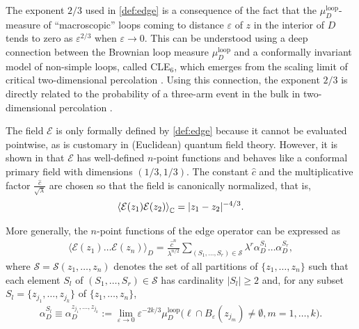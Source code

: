 \documentclass[a4paper,11pt]{article}
\begin{document}
The exponent $2/3$ used in \eqref{def:edge} is a consequence of the fact that the $\mu^{\text{loop}}_D$-measure of ``macroscopic'' loops coming to distance $\varepsilon$ of $z$ in the interior of $D$ tends to zero as $\varepsilon^{2/3}$ when $\varepsilon \to 0$. This can be understood using a deep connection \cite{2005math.....11605W} between the Brownian loop measure $\mu^{\text{loop}}_D$ and a conformally invariant model of non-simple loops, called CLE$_6$, which emerges from the scaling limit of critical two-dimensional percolation \cite{Camia_2006}. Using this connection, the exponent $2/3$ is directly related to the probability of a three-arm event in the bulk in two-dimensional percolation \cite{PhysRevLett.83.1359,Smirnov2001CRITICALEF}.

The field $\mathcal{E}$ is only formally defined by \eqref{def:edge} because it cannot be evaluated pointwise, as is customary in (Euclidean) quantum field theory. However,
it is shown in \cite{camia2021scalar} that $\mathcal{E}$ has well-defined $n$-point functions and behaves like a conformal primary field with dimensions $(1/3,1/3)$. The constant $\hat{c}$ and the multiplicative factor $\frac{\hat{c}}{\sqrt\lambda}$ are chosen so that the field is canonically normalized, that is,
\begin{align} \label{eq:canonical_edge}
    \Braket{{\mathcal E}(z_1){\mathcal E}(z_2)}_{\mathbb C} = |z_1-z_2|^{-4/3}.
\end{align}

More generally, the $n$-point functions of the edge operator can be expressed as
\begin{align} \label{eq:n-point-function}
    \langle {\mathcal E}(z_1) \ldots {\mathcal E}(z_n) \rangle_D = \frac{\hat{c}^n}{\lambda^{n/2}} \sum_{(S_1,\ldots,S_r) \in \mathcal{S}} \lambda^r \alpha^{S_1}_D\ldots\alpha^{S_r}_D,
\end{align}
where $\mathcal{S} = \mathcal{S}(z_1,\ldots,z_n)$ denotes the set of all partitions of $\{z_1,\ldots,z_n\}$ such that each element $S_l$ of $(S_1,\ldots,S_r) \in \mathcal{S}$ has cardinality $|S_l| \geq 2$ and, for any subset $S_l=\{z_{j_1},\ldots,z_{j_k}\}$ of $\{z_1,\ldots,z_n\}$, 
\begin{align}
    \alpha^{S_l}_D \equiv \alpha_D^{z_{j_1},\ldots,z_{j_k}} := \lim_{\varepsilon \to 0} \varepsilon^{-2k/3} \mu_D^{\text{loop}}\big(\ell \cap B_{\varepsilon}(z_{j_m}) \neq \emptyset, m=1,\ldots,k \big).
\end{align}
\end{document}
